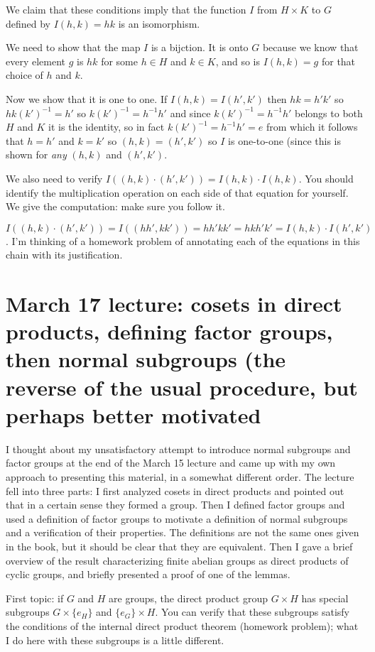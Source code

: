 \documentclass[12pt]{article}
\begin{document}
We claim that these conditions imply that the function $I$ from $H \times K$ to $G$ defined by $I(h,k) = hk$ is
an isomorphism.

We need to show that the map $I$ is a bijction.  It is onto $G$ because we know that every element $g$ is $hk$ for
some $h \in H$ and $k \in K$, and so is $I(h,k) = g$ for that choice of $h$ and $k$.

Now we show that it is one to one.  If $I(h,k)=I(h',k')$ then $hk = h'k'$ so $hk(k')^{-1} = h'$ so $k(k')^{-1}= h^{-1}h'$ and since $k(k')^{-1}= h^{-1}h'$ belongs to both $H$ and $K$ it is the identity, so in fact $k(k')^{-1}= h^{-1}h'= e$ from which it follows that $h=h'$ and $k=k'$ so $(h,k)=(h',k')$ so $I$ is one-to-one (since this is shown for {\em any\/} $(h,k)$ and $(h',k')$.

We also need to verify $I((h,k)\cdot(h',k')) = I(h,k)\cdot I(h,k)$.  You should identify the multiplication operation on each side of that equation for yourself.  We give the computation:  make sure you follow it.

$I((h,k)\cdot(h',k')) = I((hh',kk')) = hh'kk' = hkh'k' = I(h,k)\cdot I(h',k')$.  I'm thinking of a homework problem of annotating each of the equations in this chain with its justification.

\section{March 17 lecture:  cosets in direct products, defining factor groups, then normal subgroups (the reverse of the usual procedure, but perhaps better motivated}

I thought about my unsatisfactory attempt to introduce normal subgroups and factor groups at the end of the March 15 lecture and came up with my own approach to presenting this material, in a somewhat different order.  The lecture fell into three parts:  I first analyzed cosets in direct products and pointed out that in a certain sense they formed a group.  Then I defined factor groups and used a definition of factor groups to motivate a definition of normal subgroups and a verification of their properties.  The definitions are not the same ones given in the book, but it should be clear that they are equivalent.  Then I gave a brief overview of the result characterizing finite abelian groups as direct products of cyclic groups, and briefly presented a proof of one of the lemmas.

First topic:  if  $G$ and $H$ are groups, the direct product group $G \times H$ has special subgroups $G \times \{e_H\}$ and $\{e_G\} \times H$.  You can verify that these subgroups satisfy the conditions of the internal direct product theorem (homework problem);  what I do here with these subgroups is a little different.
\end{document}
